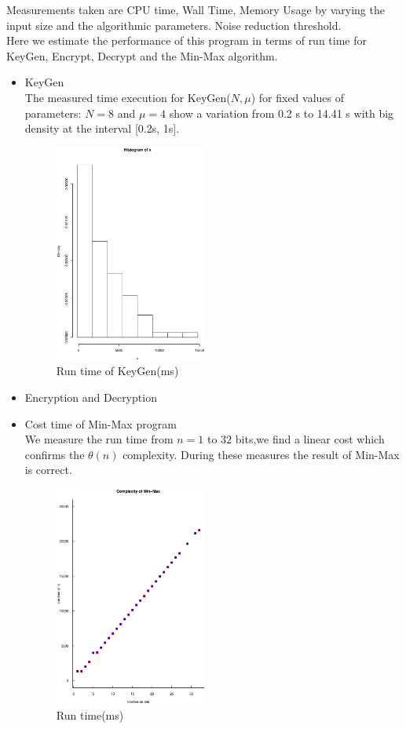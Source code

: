 \documentclass{acm_proc_article-sp}
\begin{document}
Measurements taken are CPU time, Wall Time, Memory Usage by varying the input size  and the algorithmic parameters. Noise reduction threshold.\\
Here we estimate the performance of this program in terms of run time for KeyGen, Encrypt, Decrypt and the Min-Max algorithm.
\begin{itemize}

\item KeyGen\\
The measured time execution for KeyGen($N, \mu$)  for fixed values of parameters: $N=8$ and $\mu = 4$ show a variation from 0.2 s to 14.41 s with big density at the interval [0.2s, 1s].\\
\begin{figure}[!h] %
\centering
\includegraphics[width=5cm]{f3.eps} 
\caption{Run time of KeyGen(ms)} 
\label{image_f2} %
\end{figure}
\item {Encryption and Decryption}\\


\item {Cost time of Min-Max program}\\
We measure the run time from $n=1$ to $32$ bits,we find a linear cost which confirms the $\theta(n)$ complexity. During these measures the result of Min-Max is correct. 
\begin{figure}[!h] %
\centering
\includegraphics[width=5cm]{f2.eps} 
\caption{Run time(ms)} 
\label{image_f2} %
\end{figure}


\end{itemize}
\end{document}
